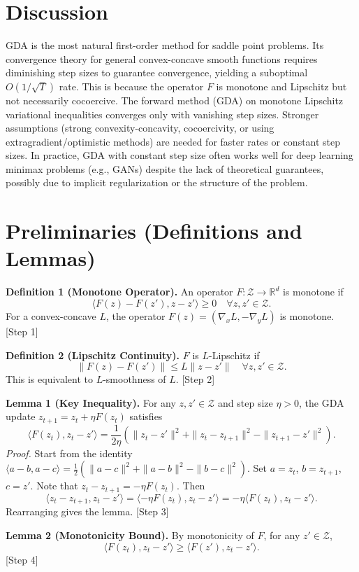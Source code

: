 \documentclass{article}
\begin{document}
\section*{Discussion}
GDA is the most natural first-order method for saddle point problems. Its convergence theory for general convex-concave smooth functions requires diminishing step sizes to guarantee convergence, yielding a suboptimal $O(1/\sqrt{T})$ rate. This is because the operator $F$ is monotone and Lipschitz but not necessarily cocoercive. The forward method (GDA) on monotone Lipschitz variational inequalities converges only with vanishing step sizes. Stronger assumptions (strong convexity-concavity, cocoercivity, or using extragradient/optimistic methods) are needed for faster rates or constant step sizes. In practice, GDA with constant step size often works well for deep learning minimax problems (e.g., GANs) despite the lack of theoretical guarantees, possibly due to implicit regularization or the structure of the problem.

\section*{Preliminaries (Definitions and Lemmas)}

\textbf{Definition 1 (Monotone Operator).} An operator $F: \mathcal{Z} \to \mathbb{R}^d$ is monotone if
\[
\langle F(z) - F(z'), z - z' \rangle \ge 0 \quad \forall z, z' \in \mathcal{Z}.
\]
For a convex-concave $L$, the operator $F(z) = (\nabla_x L, -\nabla_y L)$ is monotone. [Step 1]

\textbf{Definition 2 (Lipschitz Continuity).} $F$ is $L$-Lipschitz if
\[
\|F(z) - F(z')\| \le L \|z - z'\| \quad \forall z, z' \in \mathcal{Z}.
\]
This is equivalent to $L$-smoothness of $L$. [Step 2]

\textbf{Lemma 1 (Key Inequality).} For any $z, z' \in \mathcal{Z}$ and step size $\eta > 0$, the GDA update $z_{t+1} = z_t + \eta F(z_t)$ satisfies
\[
\langle F(z_t), z_t - z' \rangle = \frac{1}{2\eta} \left( \|z_t - z'\|^2 + \|z_t - z_{t+1}\|^2 - \|z_{t+1} - z'\|^2 \right).
\]
\textit{Proof.} Start from the identity $\langle a - b, a - c \rangle = \frac{1}{2}(\|a-c\|^2 + \|a-b\|^2 - \|b-c\|^2)$. Set $a = z_t$, $b = z_{t+1}$, $c = z'$. Note that $z_t - z_{t+1} = -\eta F(z_t)$. Then
\[
\langle z_t - z_{t+1}, z_t - z' \rangle = \langle -\eta F(z_t), z_t - z' \rangle = -\eta \langle F(z_t), z_t - z' \rangle.
\]
Rearranging gives the lemma. [Step 3]

\textbf{Lemma 2 (Monotonicity Bound).} By monotonicity of $F$, for any $z' \in \mathcal{Z}$,
\[
\langle F(z_t), z_t - z' \rangle \ge \langle F(z'), z_t - z' \rangle.
\]
[Step 4]
\end{document}
